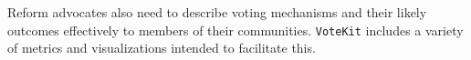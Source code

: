 \documentclass{article}
\newcommand{\VK}{{\tt VoteKit}\xspace}
\begin{document}
Reform advocates also need to describe voting mechanisms and their likely outcomes effectively to members of their communities. 
\VK includes a variety of metrics and visualizations intended to facilitate this. 

\begin{figure}[bht!] \hspace{-.5in}
\end{figure}
\end{document}
